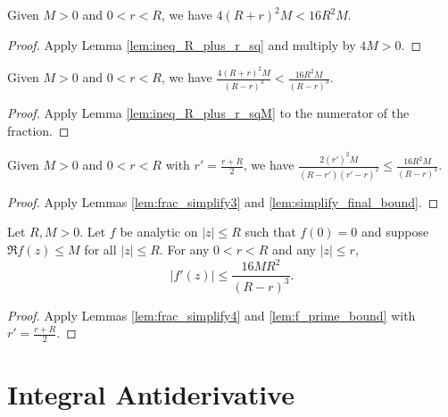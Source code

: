 
\begin{lemma}\label{lem:ineq_R_plus_r_sqM} \leanok
Given $M>0$ and $0 < r < R$, we have $4(R+r)^2M < 16R^2M$.
\end{lemma}
\begin{proof}\leanok
{}
Apply Lemma \ref{lem:ineq_R_plus_r_sq} and multiply by $4M>0$.
\end{proof}


\begin{lemma}\label{lem:simplify_final_bound} \leanok
Given $M>0$ and $0 < r < R$, we have $\frac{4(R+r)^2 M}{(R-r)^3} < \frac{16R^2 M}{(R-r)^3}$.
\end{lemma}
\begin{proof}\leanok
{}
Apply Lemma \ref{lem:ineq_R_plus_r_sqM} to the numerator of the fraction.
\end{proof}


\begin{lemma} \label{lem:frac_simplify4} \leanok
Given $M>0$ and $0 < r < R$ with $r'=\frac{r+R}{2}$, we have $\frac{2(r')^2M}{(R-r')(r'-r)^2} \leq \frac{16R^2 M}{(R-r)^3}$.
\end{lemma}
\begin{proof}
\leanok
{}
Apply Lemmas \ref{lem:frac_simplify3} and \ref{lem:simplify_final_bound}.
\end{proof}


\begin{theorem} \label{thm:BCII} \leanok
Let $R,M>0$. Let $f$ be analytic on $|z| \le R$ such that $f(0)=0$ and suppose $\Re f(z) \le M$ for all $|z| \le R$. For any $0<r < R$ and any $|z|\le r$,
\[ |f'(z)| \le \frac{16M R^2}{(R-r)^3}. \]
\end{theorem}
\begin{proof}\leanok
{}
Apply Lemmas \ref{lem:frac_simplify4} and \ref{lem:f_prime_bound} with $r'=\frac{r+R}{2}$.
\end{proof}


\section{Integral Antiderivative}

